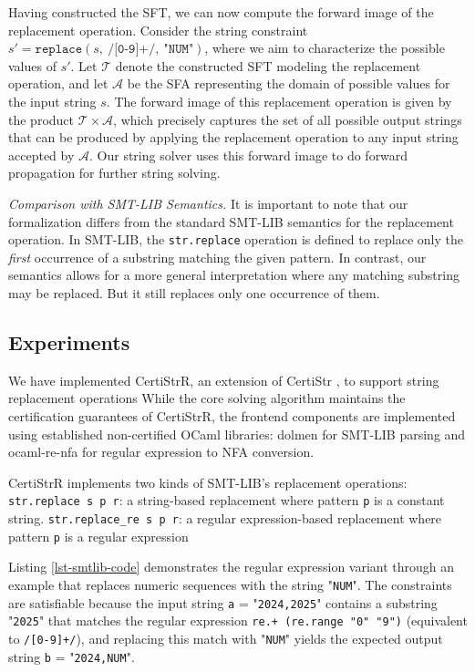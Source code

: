 \documentclass[a4paper,UKenglish,cleveref, autoref, thm-restate]{lipics-v2021}
\begin{document}
  Having constructed the SFT, we can now compute the forward image of the replacement operation. Consider the string constraint $s' = \texttt{replace}(s,~\texttt{/[0-9]+/},~\text{"}\texttt{NUM}\text{"})$, where we aim to characterize the possible values of $s'$. Let $\mathcal{T}$ denote the constructed SFT modeling the replacement operation, and let $\mathcal{A}$ be the SFA representing the domain of possible values for the input string $s$. The forward image of this replacement operation is given by the product $\mathcal{T} \times \mathcal{A}$, which precisely captures the set of all possible output strings that can be produced by applying the replacement operation to any input string accepted by $\mathcal{A}$.
  Our string solver uses this forward image to do forward propagation for further string solving.

  \emph{Comparison with SMT-LIB Semantics.} It is important to note that our formalization differs from the standard SMT-LIB semantics for the replacement operation. In SMT-LIB, the \texttt{str.replace} operation is defined to replace only the \emph{first} occurrence of a substring matching the given pattern. In contrast, our semantics allows for a more general interpretation where any matching substring may be replaced. But it still replaces only one occurrence of them.




\subsection{Experiments}

We have implemented CertiStrR, an extension of  CertiStr \cite{cpp/KanLRS22}, to support string replacement operations
While the core solving algorithm maintains the certification guarantees of CertiStrR, the frontend components are implemented using established non-certified  OCaml libraries: dolmen \cite{dolmen} for SMT-LIB parsing and ocaml-re-nfa \cite{ocaml-re-nfa} for regular expression to NFA conversion. 

CertiStrR implements two kinds of SMT-LIB's replacement operations:
\texttt{str.replace s p r}: a string-based replacement where pattern \texttt{p} is a constant string. \texttt{str.replace\_re s p r}: a regular expression-based replacement where pattern \texttt{p} is a regular expression

Listing \ref{lst-smtlib-code} demonstrates the regular expression variant through an example that replaces numeric sequences with the string "\texttt{NUM}". The constraints are satisfiable because the input string \texttt{a} = "\texttt{2024,2025}" contains a substring "\texttt{2025}" that matches the regular expression \texttt{re.+ (re.range "0" "9")} (equivalent to \texttt{/[0-9]+/}), and replacing this match with "\texttt{NUM}" yields the expected output string \texttt{b} = "\texttt{2024,NUM}".
%
\end{document}
